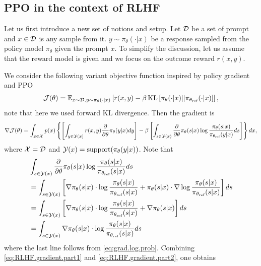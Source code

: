 \subsection{PPO in the context of RLHF}
Let us first introduce a new set of notions and setup. Let ${\cal D}$ be a set of prompt and $x\in{\cal D}$ is any sample from it. $y\sim \pi_{\theta}(\cdot|x)$ be a response sampled from the policy model $\pi_{\theta}$ given the prompt $x$. To simplify the discussion, let us assume that the reward model is given and we focus on the outcome reward $r(x,y)$. 

We consider the following variant objective function inspired by policy gradient and PPO
\begin{align*}
   {\cal J}(\theta) = \mathbb{E}_{x\sim {\cal D}, y\sim\pi_{\theta}(\cdot|x)} \left[ r(x,y) - \beta \operatorname{KL}\left[\pi_{\theta}(\cdot|x) || \pi_{\theta_{\text{ref}}}(\cdot|x)\right]\right],
\end{align*}
note that here we used forward KL divergence.
Then the gradient is 
\begin{align}\label{eq:RLHF.gradient.part1}
\nabla {\cal J}(\theta) = \int_{x\in {\cal X}} p(x)\left\{\left[\int_{y\in{\cal Y}(x)}r(x,y)\frac{\partial}{\partial \theta}\pi_{\theta}(y|x)dy\right] - \beta \left[\int_{s\in{\cal Y}(x)}\frac{\partial}{\partial\theta}\pi_{\theta}(s|x)\log\frac{\pi_{\theta}(s|x)}{\pi_{\theta_{\text{ref}}}(y|x)}ds\right] \right\}dx,
\end{align}
where ${\cal X}={\cal D}$ and ${\cal Y}(x)=\text{support}(\pi_{\theta}(y|x))$.
Note that
\begin{align}
    & \int_{s\in{\cal Y}(x)}\frac{\partial}{\partial\theta}\pi_{\theta}(s|x)\log\frac{\pi_{\theta}(s|x)}{\pi_{\theta_{\text{ref}}}(s|x)}ds  \nonumber\\
    & =  \int_{s\in{\cal Y}(x)}\left[\nabla\pi_{\theta}(s|x)\cdot\log\frac{\pi_{\theta}(s|x)}{\pi_{\theta_{\text{ref}}}(s|x)} + \pi_{\theta}(s|x)\cdot \nabla\log\frac{\pi_{\theta}(s|x)}{\pi_{\theta_{\text{ref}}}(s|x)}\right]ds \nonumber\\
    & = \int_{s\in{\cal Y}(x)}\left[\nabla\pi_{\theta}(s|x)\cdot\log\frac{\pi_{\theta}(s|x)}{\pi_{\theta_{\text{ref}}}(s|x)} + \nabla \pi_{\theta}(s|x)\right]ds \nonumber\\
    & = \int_{s\in{\cal Y}(x)}\nabla\pi_{\theta}(s|x)\cdot\log\frac{\pi_{\theta}(s|x)}{\pi_{\theta_{\text{ref}}}(s|x)} ds \label{eq:RLHF.gradient.part2}
\end{align}  
where the last line follows from \eqref{eq:grad.log.prob}. Combining \eqref{eq:RLHF.gradient.part1} and \eqref{eq:RLHF.gradient.part2}, one obtains
